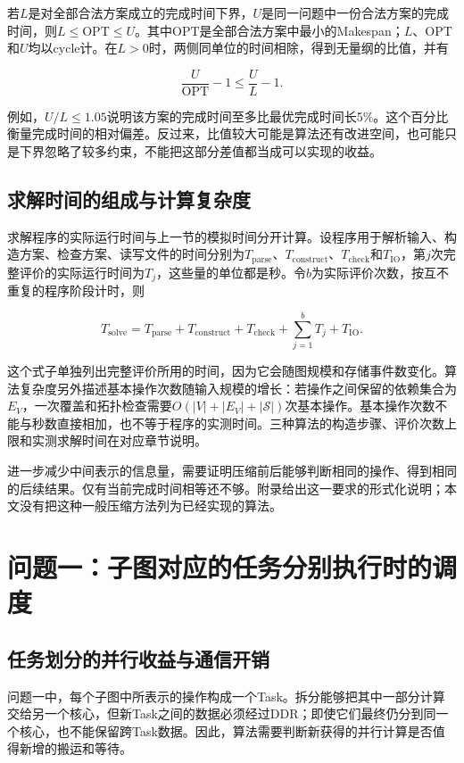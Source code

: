 \documentclass[anonymous,notoc]{gmcm2026}
\begin{document}
若\(L\)是对全部合法方案成立的完成时间下界，\(U\)是同一问题中一份合法方案的完成时间，则\(L\le\mathrm{OPT}\le U\)。其中\(\mathrm{OPT}\)是全部合法方案中最小的Makespan；\(L\)、\(\mathrm{OPT}\)和\(U\)均以cycle计。在\(L>0\)时，两侧同单位的时间相除，得到无量纲的比值，并有

\[\frac{U}{\mathrm{OPT}}-1\le\frac UL-1.\]

例如，\(U/L\le1.05\)说明该方案的完成时间至多比最优完成时间长5\%。这个百分比衡量完成时间的相对偏差。反过来，比值较大可能是算法还有改进空间，也可能只是下界忽略了较多约束，不能把这部分差值都当成可以实现的收益。

\subsection{求解时间的组成与计算复杂度}

求解程序的实际运行时间与上一节的模拟时间分开计算。设程序用于解析输入、构造方案、检查方案、读写文件的时间分别为\(T_{\mathrm{parse}}\)、\(T_{\mathrm{construct}}\)、\(T_{\mathrm{check}}\)和\(T_{\mathrm{IO}}\)，第\(j\)次完整评价的实际运行时间为\(T_j\)，这些量的单位都是秒。令\(b\)为实际评价次数，按互不重复的程序阶段计时，则

\[T_{\mathrm{solve}}=T_{\mathrm{parse}}+T_{\mathrm{construct}}+T_{\mathrm{check}}+\sum_{j=1}^{b}T_j+T_{\mathrm{IO}}.\]

这个式子单独列出完整评价所用的时间，因为它会随图规模和存储事件数变化。算法复杂度另外描述基本操作次数随输入规模的增长：若操作之间保留的依赖集合为\(E_V\)，一次覆盖和拓扑检查需要\(O(|V|+|E_V|+|\mathcal S|)\)次基本操作。基本操作次数不能与秒数直接相加，也不等于程序的实测时间。三种算法的构造步骤、评价次数上限和实测求解时间在对应章节说明。

进一步减少中间表示的信息量，需要证明压缩前后能够判断相同的操作、得到相同的后续结果。仅有当前完成时间相等还不够。附录给出这一要求的形式化说明；本文没有把这种一般压缩方法列为已经实现的算法。


\section{问题一：子图对应的任务分别执行时的调度}

\subsection{任务划分的并行收益与通信开销}

问题一中，每个子图中所表示的操作构成一个Task。拆分能够把其中一部分计算交给另一个核心，但新Task之间的数据必须经过DDR；即使它们最终仍分到同一个核心，也不能保留跨Task数据。因此，算法需要判断新获得的并行计算是否值得新增的搬运和等待。
\end{document}
